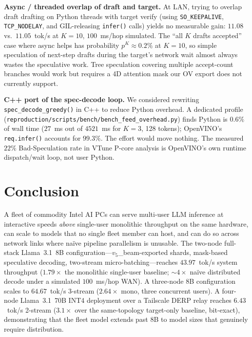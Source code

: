 \documentclass[11pt]{article}
\newcommand{\brk}{\discretionary{}{}{}}
\begin{document}
\textbf{Async / threaded overlap of draft and target.} At LAN, trying to overlap draft drafting on Python threads with target verify (using \texttt{SO\_KEEPALIVE}, \texttt{TCP\_NODELAY}, and GIL-releasing \texttt{infer()} calls) yields no measurable gain: $11.08$ vs.\ $11.05$~tok/s at $K\!=\!10$, $100$~ms/hop simulated. The ``all $K$ drafts accepted'' case where async helps has probability $p^K \approx 0.2\%$ at $K\!=\!10$, so simple speculation of next-step drafts during the target's network wait almost always wastes the speculative work. Tree speculation covering multiple accept-count branches would work but requires a 4D attention mask our OV export does not currently support.

\textbf{C++ port of the spec-decode loop.} We considered rewriting \texttt{spec\_\brk decode\_\brk greedy()} in C++ to reduce Python overhead. A dedicated profile (\texttt{reproduction/\brk scripts/\brk bench/\brk bench\_\brk feed\_\brk overhead.py}) finds Python is $0.6\%$ of wall time ($27$~ms out of $4521$~ms for $K\!=\!3$, 128 tokens); OpenVINO's \texttt{req.infer()} accounts for $99.3\%$. The effort would move nothing. The measured $22\%$ Bad-Speculation rate in VTune P-core analysis is OpenVINO's own runtime dispatch/wait loop, not user Python.

\section{Conclusion}
\label{sec:conclusion}

A fleet of commodity Intel AI PCs can serve multi-user LLM inference at interactive speeds \emph{above} single-user monolithic throughput on the same hardware, can scale to models that no single fleet member can host, and can do so across network links where naïve pipeline parallelism is unusable. The two-node full-stack Llama~3.1~8B configuration---$v_5$\_beam-exported shards, mask-based speculative decoding, two-stream micro-batching---reaches $43.97$~tok/s system throughput ($1.79\times$ the monolithic single-user baseline; ${\sim}4\times$ naïve distributed decode under a simulated $100$~ms/hop WAN). A three-node 8B configuration scales to $64.67$~tok/s 3-stream ($2.64\times$ mono, three concurrent users). A four-node Llama~3.1~70B INT4 deployment over a Tailscale DERP relay reaches $6.43$~tok/s 2-stream ($3.1\times$ over the same-topology target-only baseline, bit-exact), demonstrating that the fleet model extends past 8B to model sizes that genuinely require distribution.
\end{document}
